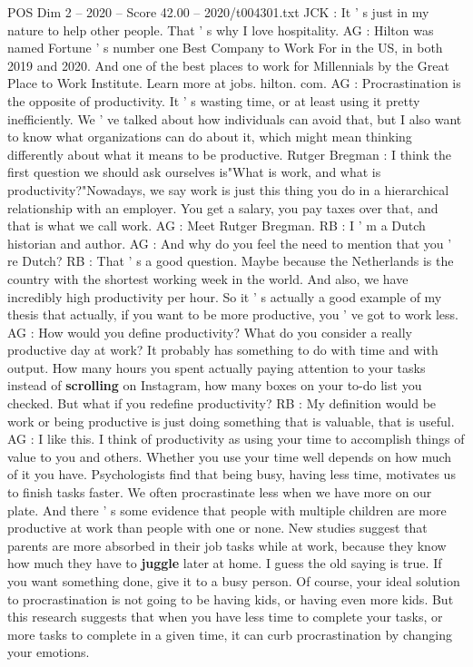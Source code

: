\begin{textsample}{POS Dim 2 – 2020 – Score 42.00 – 2020/t004301.txt}
JCK : It ' s just in my nature to help other people.
That ' s why I love hospitality.
AG : Hilton was named Fortune ' s number one Best Company to Work For in the US, in both 2019 and 2020.
And one of the best places to work for Millennials by the Great Place to Work Institute.
Learn more at jobs. hilton. com.
AG : Procrastination is the opposite of productivity.
It ' s wasting time, or at least using it pretty inefficiently.
We ' ve talked about how individuals can avoid that, but I also want to know what organizations can do about it, which might mean thinking differently about what it means to be productive.
Rutger Bregman : I think the first question we should ask ourselves is"What is work, and what is productivity?"Nowadays, we say work is just this thing you do in a hierarchical relationship with an employer.
You get a salary, you pay taxes over that, and that is what we call work.
AG : Meet Rutger Bregman.
RB : I ' m a Dutch historian and author.
AG : And why do you feel the need to mention that you ' re Dutch?
RB : That ' s a good question.
Maybe because the Netherlands is the country with the shortest working week in the world.
And also, we have incredibly high productivity per hour.
So it ' s actually a good example of my thesis that actually, if you want to be more productive, you ' ve got to work less.
AG : How would you define productivity?
What do you consider a really productive day at work?
It probably has something to do with time and with output.
How many hours you spent actually paying attention to your tasks instead of \textbf{scrolling} on Instagram, how many boxes on your to-do list you checked.
But what if you redefine productivity?
RB : My definition would be work or being productive is just doing something that is valuable, that is useful.
AG : I like this.
I think of productivity as using your time to accomplish things of value to you and others.
Whether you use your time well depends on how much of it you have.
Psychologists find that being busy, having less time, motivates us to finish tasks faster.
We often procrastinate less when we have more on our plate.
And there ' s some evidence that people with multiple children are more productive at work than people with one or none.
New studies suggest that parents are more absorbed in their job tasks while at work, because they know how much they have to \textbf{juggle} later at home.
I guess the old saying is true.
If you want something done, give it to a busy person.
Of course, your ideal solution to procrastination is not going to be having kids, or having even more kids.
But this research suggests that when you have less time to complete your tasks, or more tasks to complete in a given time, it can curb procrastination by changing your emotions.

\end{textsample}
